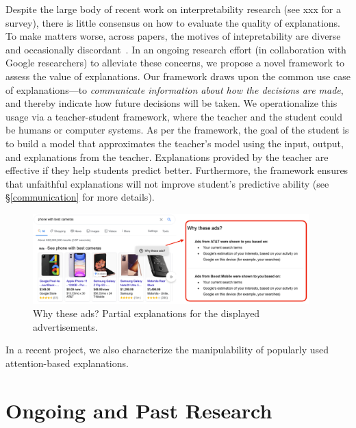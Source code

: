 \documentclass{article}
\newcommand{\dd}[1]{\textcolor{red}{[  #1 -- Danish]}\typeout{#1}}
\begin{document}
Despite the large body of recent work on interpretability research (see xxx for a survey), 
there is little consensus on %
how to evaluate the quality of explanations.
To make matters worse, across papers,
the motives 
of intepretability 
are diverse 
and occasionally discordant~\cite{lipton2018mythos}.
In an ongoing research effort (in collaboration with Google researchers) to alleviate these concerns, 
we propose a novel framework to assess the value of explanations.
Our framework draws upon the common use case of explanations---to \emph{communicate information
about how the decisions are made}, and thereby indicate how future decisions will be taken.
We operationalize this usage 
via a teacher-student framework, where the teacher and the student could be humans or computer systems.
As per the framework, the goal of the student is to build a model that approximates the teacher's model
using the input, output, and explanations from the teacher.
Explanations provided by the teacher are effective if they help students predict better. 
Furthermore, the framework ensures 
that unfaithful explanations will not improve student's predictive ability (see \S\ref{communication} for more details).

\begin{figure}[t]
    \centering
    \includegraphics[width=0.95\textwidth]{google_ads}
    \caption{
     Why these ads? Partial explanations for the displayed advertisements.
    }
    \label{fig:google_ads}
\end{figure}

In a recent project, we also characterize the manipulability of popularly used attention-based explanations.



\section{Ongoing and Past Research}
\end{document}
